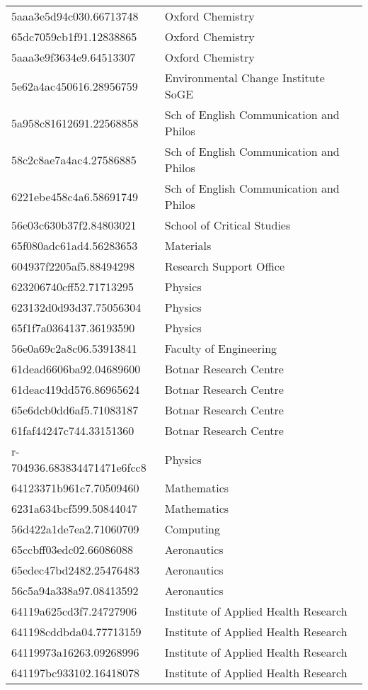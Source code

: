 \begin{tabular}{ll}
5aaa3e5d94c030.66713748 & Oxford Chemistry \\
65dc7059cb1f91.12838865 & Oxford Chemistry \\
5aaa3e9f3634e9.64513307 & Oxford Chemistry \\
5e62a4ac450616.28956759 & Environmental Change Institute SoGE \\
5a958c81612691.22568858 & Sch of English Communication and Philos \\
58c2c8ae7a4ac4.27586885 & Sch of English Communication and Philos \\
6221ebe458c4a6.58691749 & Sch of English Communication and Philos \\
56e03c630b37f2.84803021 & School of Critical Studies \\
65f080adc61ad4.56283653 & Materials \\
604937f2205af5.88494298 & Research Support Office \\
623206740cff52.71713295 & Physics \\
623132d0d93d37.75056304 & Physics \\
65f1f7a0364137.36193590 & Physics \\
56e0a69c2a8c06.53913841 & Faculty of Engineering \\
61dead6606ba92.04689600 & Botnar Research Centre \\
61deac419dd576.86965624 & Botnar Research Centre \\
65e6dcb0dd6af5.71083187 & Botnar Research Centre \\
61faf44247c744.33151360 & Botnar Research Centre \\
r-704936.683834471471e6fcc8 & Physics \\
64123371b961c7.70509460 & Mathematics \\
6231a634bcf599.50844047 & Mathematics \\
56d422a1de7ea2.71060709 & Computing \\
65ccbff03edc02.66086088 & Aeronautics \\
65edec47bd2482.25476483 & Aeronautics \\
56c5a94a338a97.08413592 & Aeronautics \\
64119a625cd3f7.24727906 & Institute of Applied Health Research \\
641198cddbda04.77713159 & Institute of Applied Health Research \\
64119973a16263.09268996 & Institute of Applied Health Research \\
641197bc933102.16418078 & Institute of Applied Health Research \\

\end{tabular}
